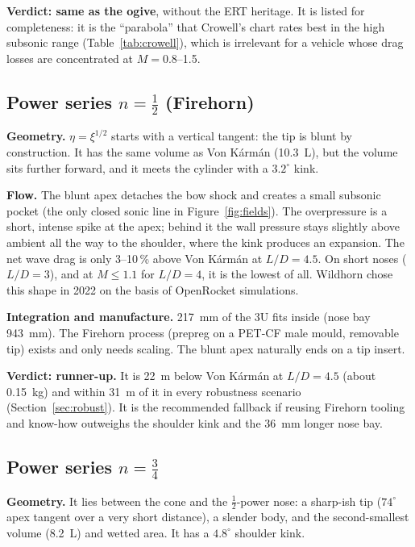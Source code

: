 \textbf{Verdict: same as the ogive}, without the ERT heritage. It is listed for completeness: it is
the ``parabola'' that Crowell's chart rates best in the high subsonic range (Table~\ref{tab:crowell}),
which is irrelevant for a vehicle whose drag losses are concentrated at $M = 0.8$--1.5.

\subsection{Power series $n = \tfrac12$ (Firehorn)}

\textbf{Geometry.} $\eta = \xi^{1/2}$ starts with a vertical tangent: the tip is blunt by
construction. It has the same volume as Von K\'arm\'an (\SI{10.3}{L}), but the volume sits
further forward, and it meets the cylinder with a $3.2^\circ$ kink.

\textbf{Flow.} The blunt apex detaches the bow shock and creates a small subsonic pocket (the only
closed sonic line in Figure~\ref{fig:fields}). The overpressure is a short, intense spike at the
apex; behind it the wall pressure stays slightly above ambient all the way to the shoulder, where
the kink produces an expansion. The net wave drag is only 3--10\,\% above Von K\'arm\'an at
$L/D=4.5$. On short noses ($L/D = 3$), and at $M \leq 1.1$ for $L/D = 4$, it is the lowest of all.
Wildhorn chose this shape in 2022 on the basis of OpenRocket simulations.

\textbf{Integration and manufacture.} \SI{217}{mm} of the 3U fits inside (nose bay
\SI{943}{mm}). The Firehorn process (prepreg on a PET-CF male mould, removable tip) exists and
only needs scaling. The blunt apex naturally ends on a tip insert.

\textbf{Verdict: runner-up.} It is \SI{22}{m} below Von K\'arm\'an at $L/D=4.5$ (about
\SI{0.15}{kg}) and within \SI{31}{m} of it in every robustness scenario (Section~\ref{sec:robust}). It is the
recommended fallback if reusing Firehorn tooling and know-how outweighs the shoulder kink and the
\SI{36}{mm} longer nose bay.

\subsection{Power series $n = \tfrac34$}

\textbf{Geometry.} It lies between the cone and the $\tfrac12$-power nose: a sharp-ish tip ($74^\circ$
apex tangent over a very short distance), a slender body, and the second-smallest volume
(\SI{8.2}{L}) and wetted area. It has a $4.8^\circ$ shoulder kink.

